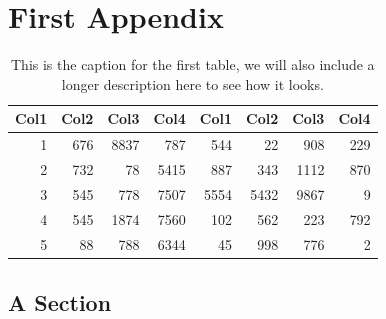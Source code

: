 \chapter{First Appendix}
    \lipsum[1]
    \begin{table}
        \centering
        \begin{tabular}{r r r r r r r r}
             Col1 & Col2 & Col3 & Col4 & Col1 & Col2 & Col3 & Col4 \\
             \hline
             1    & 676  & 8837 & 787  & 544  & 22   & 908  & 229  \\
             2    & 732  & 78   & 5415 & 887  & 343  & 1112 & 870  \\
             3    & 545  & 778  & 7507 & 5554 & 5432 & 9867 & 9    \\
             4    & 545  & 1874 & 7560 & 102  & 562  & 223  & 792  \\
             5    & 88   & 788  & 6344 & 45   & 998  & 776  & 2    \\
             \hline
        \end{tabular}
        \caption{This is the caption for the first table, we will also include a longer description here to see how it looks.}
    \end{table}
    \lipsum[2]

\section{A Section}
    \lipsum[1]